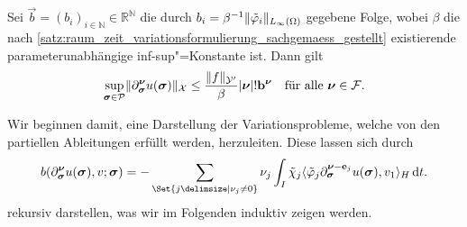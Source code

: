 \documentclass[../main.tex]{subfiles}
\begin{document}
\begin{Satz}
\label{satz:abschaetzung_norm_partieller_ableitungen}
    Sei $\vec b = (b_i)_{i \in \mathbb{N}} \in \mathbb{R}^{\mathbb{N}}$ die durch $b_{i} = \beta^{-1} \lVert\tilde{\varphi}_{i}\rVert_{L_{\infty}(\Omega)}$ gegebene Folge, wobei $\beta$ die nach \cref{satz:raum_zeit_variationsformulierung_sachgemaess_gestellt} existierende parameterunabhängige inf-sup"=Konstante ist.
    Dann gilt
    \begin{equation}
        \label{eq:abschaetzung_norm_partieller_ableitungen}
        \sup_{\bm\sigma \in \mathcal P} \norm{\partial^{\bm\nu}_{\bm\sigma} u(\bm\sigma)}_{\mathcal X} \leq \frac{\norm{f}_{\mathcal Y'}}{\beta} \abs{\bm\nu}! \vec b^{\bm\nu} \quad \fa \bm \nu \in \mathcal F.
    \end{equation}

    \begin{Beweis}
        Wir beginnen damit, eine Darstellung der Variationsprobleme, welche von den partiellen Ableitungen erfüllt werden, herzuleiten.
        Diese lassen sich durch
        \begin{equation}
        \label{eq:abschaetzung_norm_partieller_ableitungen:rekursiv}
            b(\partial^{\bm\nu}_{\bm\sigma} u(\bm\sigma), v; \bm\sigma)
            = - \sum_{\Set{j \given \nu_{j} \neq 0}} \nu_{j} \int_{I} \tilde{\chi}_{j} \skp{\tilde{\varphi}_{j} \partial^{\bm\nu - \vec e_{j}}_{\bm\sigma} u(\bm\sigma)}{v_{1}}{H} \diff t.
        \end{equation}
        rekursiv darstellen, was wir im Folgenden induktiv zeigen werden.


\end{Beweis}
\end{Satz}
\end{document}
